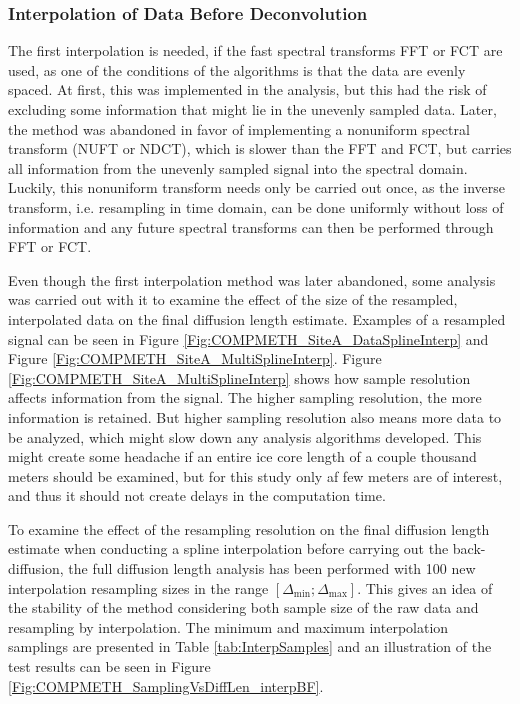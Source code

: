 \documentclass[../../CompleteThesis2/Complete_2ndDraft]{subfiles}
\begin{document}
\subsubsection[Interpolation 1]{Interpolation of Data Before Deconvolution}
\label{Subsubsec:METH_Interpolation_BFdecon}

The first interpolation is needed, if the fast spectral transforms FFT or FCT are used, as one of the conditions of the algorithms is that the data are evenly spaced. At first, this was implemented in the analysis, but this had the risk of excluding some information that might lie in the unevenly sampled data. Later, the method was abandoned in favor of implementing a nonuniform spectral transform (NUFT or NDCT), which is slower than the FFT and FCT, but carries all information from the unevenly sampled signal into the spectral domain. Luckily, this nonuniform transform needs only be carried out once, as the inverse transform, i.e. resampling in time domain, can be done uniformly without loss of information and any future spectral transforms can then be performed through FFT or FCT.

Even though the first interpolation method was later abandoned, some analysis was carried out with it to examine the effect of the size of the resampled, interpolated data on the final diffusion length estimate. Examples of a resampled signal can be seen in Figure \ref{Fig:COMPMETH_SiteA_DataSplineInterp} and Figure \ref{Fig:COMPMETH_SiteA_MultiSplineInterp}. Figure \ref{Fig:COMPMETH_SiteA_MultiSplineInterp} shows how sample resolution affects information from the signal. The higher sampling resolution, the more information is retained. But higher sampling resolution also means more data to be analyzed, which might slow down any analysis algorithms developed. This might create some headache if an entire ice core length of a couple thousand meters should be examined, but for this study only af few meters are of interest, and thus it should not create delays in the computation time.

To examine the effect of the resampling resolution on the final diffusion length estimate when conducting a spline interpolation before carrying out the back-diffusion, the full diffusion length analysis has been performed with 100 new interpolation resampling sizes in the range $[\Delta_{\text{min}};\Delta_{\text{max}}]$. This gives an idea of the stability of the method considering both sample size of the raw data and resampling by interpolation. The minimum and maximum interpolation samplings are presented in Table \ref{tab:InterpSamples} and an illustration of the test results can be seen in Figure \ref{Fig:COMPMETH_SamplingVsDiffLen_interpBF}. 
\end{document}
